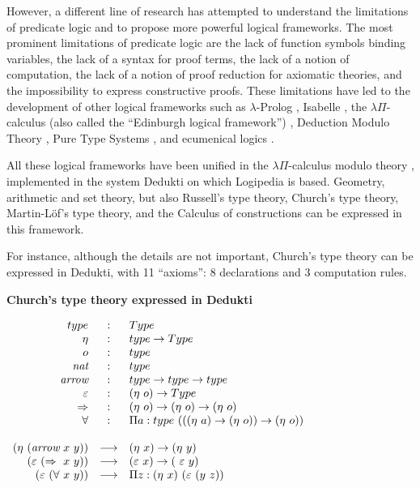 However, a different line of research has attempted to understand the
limitations of predicate logic and to propose more powerful logical
frameworks.  The most prominent limitations of predicate logic are the
lack of function symbols binding variables, the lack of a syntax for
proof terms, the lack of a notion of computation, the lack of a notion
of proof reduction for axiomatic theories, and the impossibility to
express constructive proofs. These limitations have led to the
development of other logical frameworks such as $\lambda$-Prolog
\cite{NadathurMiller88, MillerNadathur12}, Isabelle \cite{Paulson90},
the $\lambda \Pi$-calculus (also called the ``Edinburgh logical
framework'') \cite{HarperHonsellPlotkin91}, Deduction Modulo Theory
\cite{DowekHardinKirchner03, DowekWerner03}, Pure Type Systems
\cite{Berardi88,Terlouw89}, and ecumenical logics
\cite{Prawitz15,Dowek15,PereiraRodriguez17}.

All these logical frameworks have been unified in the $\lambda
\Pi$-calculus modulo theory \cite{CousineauDowek07}, implemented in
the system Dedukti \cite{Assaf16} on which Logipedia is
based. Geometry, arithmetic and set theory, but also Russell's type
theory, Church's type theory, Martin-L\"of's type theory, and the
Calculus of constructions can be expressed in this framework.

For instance, although the details are not important, Church's type
theory can be expressed in Dedukti, with 11 ``axioms'': 8 declarations
and 3 computation rules.

\begin{framed}
\vspace{-0.5cm}
\begin{center}
{\bf \Large Church's type theory expressed in Dedukti}
\end{center}

$\begin{array}{rcl}
type&:&Type\\
\eta&:&type \rightarrow Type\\
o&:&type\\
\mbox{\it nat}&:&type\\
\mbox{\it arrow}&:&type \rightarrow type \rightarrow type\\
\varepsilon&:&(\eta~o) \rightarrow Type\\
\Rightarrow&:&(\eta~o) \rightarrow (\eta~o) \rightarrow (\eta~o)\\
\forall&:&\Pi a:type~(((\eta~a) \rightarrow (\eta~o)) \rightarrow (\eta~o))\\
\\
(\eta~(\mbox{\it arrow}~x~y)) &\longrightarrow& (\eta~x) \rightarrow (\eta~y)\\
(\varepsilon~(\Rightarrow~x~y)) &\longrightarrow& (\varepsilon~x) \rightarrow (\
\varepsilon~y)\\
(\varepsilon~(\forall~x~y)) &\longrightarrow& \Pi z:(\eta~x)~(\varepsilon~(y~z))
\end{array}$
\end{framed}

